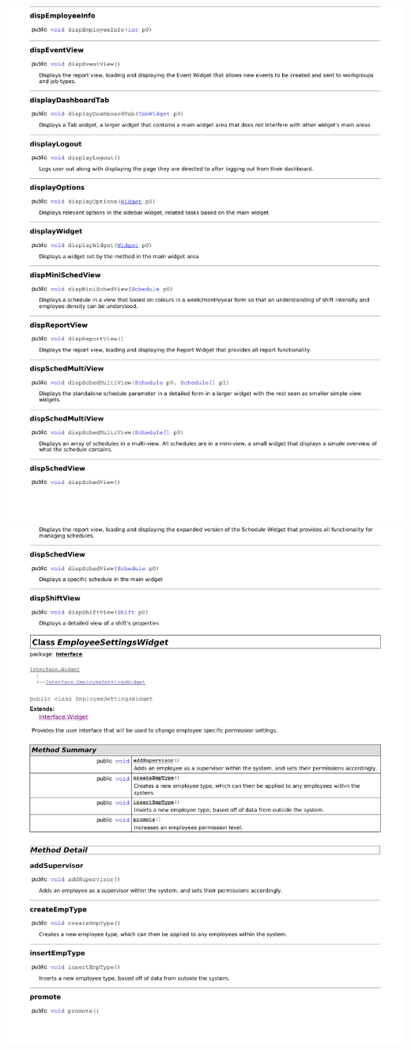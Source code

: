 \documentclass[letterpaper,12pt]{report}
\begin{document}
\includegraphics[scale=0.9,trim=20mm 30mm 25mm 25mm]{externals/di2.pdf}
\newpage
\includegraphics[scale=0.9,trim=20mm 30mm 25mm 25mm]{externals/di3.pdf}
\end{document}
